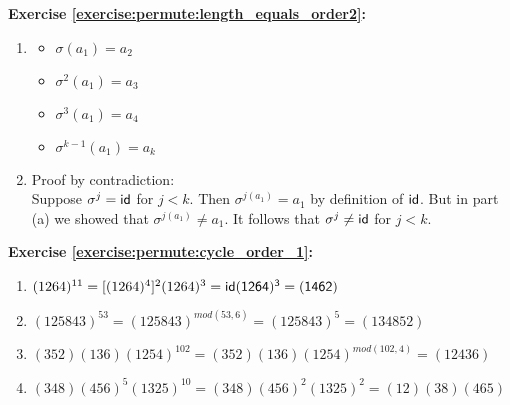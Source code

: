 \noindent\textbf{Exercise \ref{exercise:permute:length_equals_order2}:}
\begin{enumerate}[{a.}]
\item
	\begin{multicols}{3}
	\begin{itemize}
	\item
	$\sigma(a_1) = a_2$
	
	\item
	$\sigma^2(a_1) = a_3$
	
	\item
	$\sigma^3(a_1) = a_4$
	
	\item
	$\sigma^{k-1}(a_1) = a_k$
	\end{itemize}
	\end{multicols}
	
\item
Proof by contradiction:
\\
Suppose $\sigma^j = \sf{id}$ for $j < k$. Then $\sigma^{j(a_1)} = a_1$ by definition of $\sf{id}$. But in part (a) we showed that $\sigma^{j(a_1)} \neq a_1$.  It follows that $\sigma^j \neq \sf{id}$ for $j < k$. 
\end{enumerate}

\noindent\textbf{Exercise \ref{exercise:permute:cycle_order_1}:} %
\begin{enumerate}[{a.}]
\item
$(1264)^{11} = [(1264)^4]^2(1264)^3 = \sf{id}(1264)^3 = (1462)$

\item
$(125843)^{53} = (125843)^{mod(53,6)} = (125843)^5 = (134852)$

\item
$(352)(136)(1254)^{102} = (352)(136)(1254)^{mod(102,4)} = (12436)$

\item
$(348)(456)^5(1325)^{10} = (348)(456)^2(1325)^2 = (12)(38)(465)$
\end{enumerate}

